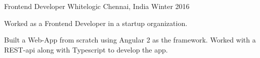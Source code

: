 

\begin{cventries}

  \cventry
    {Frontend Developer} %
    {Whitelogic} %
    {Chennai, India} %
    {Winter 2016} %
    {
      \begin{cvitems} %
      \item {Worked as a Frontend Developer in a startup organization.}
        \item {Built a Web-App from scratch using Angular 2 as the framework.
            Worked with a REST-api along with Typescript to develop the app.}
      \end{cvitems}
    }

\end{cventries}
